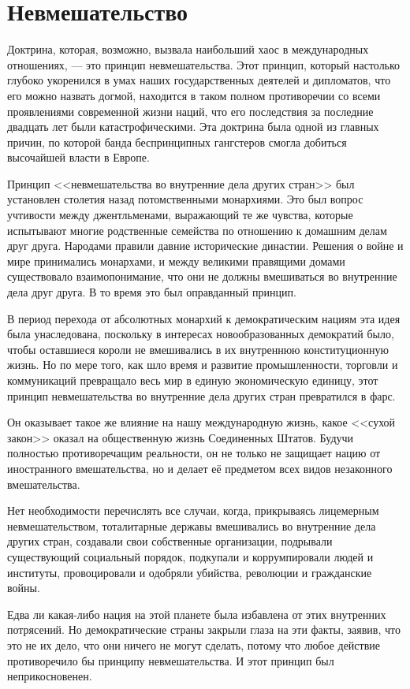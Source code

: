\chapter{Невмешательство}

Доктрина, которая, возможно, вызвала наибольший хаос в международных отношениях, — это принцип невмешательства. Этот принцип, который настолько глубоко укоренился в умах наших государственных деятелей и дипломатов, что его можно назвать догмой, находится в таком полном противоречии со всеми проявлениями современной жизни наций, что его последствия за последние двадцать лет были катастрофическими. Эта доктрина была одной из главных причин, по которой банда беспринципных гангстеров смогла добиться высочайшей власти в Европе.
 
Принцип <<невмешательства во внутренние дела других стран>> был установлен столетия назад потомственными монархиями. Это был вопрос учтивости между джентльменами, выражающий те же чувства, которые испытывают многие родственные семейства по отношению к домашним делам друг друга. Народами правили давние исторические династии. Решения о войне и мире принимались монархами, и между великими правящими домами существовало взаимопонимание, что они не должны вмешиваться во внутренние дела друг друга. В то время это был оправданный принцип.

В период перехода от абсолютных монархий к демократическим нациям эта идея была унаследована, поскольку в интересах новообразованных демократий было, чтобы оставшиеся короли не вмешивались в их внутреннюю конституционную жизнь. Но по мере того, как шло время и развитие промышленности, торговли и коммуникаций превращало весь мир в единую экономическую единицу, этот принцип невмешательства во внутренние дела других стран превратился в фарс.
 
Он оказывает такое же влияние на нашу международную жизнь, какое <<сухой закон>> оказал на общественную жизнь Соединенных Штатов. Будучи полностью противоречащим реальности, он не только не защищает нацию от иностранного вмешательства, но и делает её предметом всех видов незаконного вмешательства.

Нет необходимости перечислять все случаи, когда, прикрываясь лицемерным невмешательством, тоталитарные державы вмешивались во внутренние дела других стран, создавали свои собственные организации, подрывали существующий социальный порядок, подкупали и коррумпировали людей и институты, провоцировали и одобряли убийства, революции и гражданские войны.
 
Едва ли какая-либо нация на этой планете была избавлена от этих внутренних потрясений. Но демократические страны закрыли глаза на эти факты, заявив, что это не их дело, что они ничего не могут сделать, потому что любое действие противоречило бы принципу невмешательства. И этот принцип был неприкосновенен.

